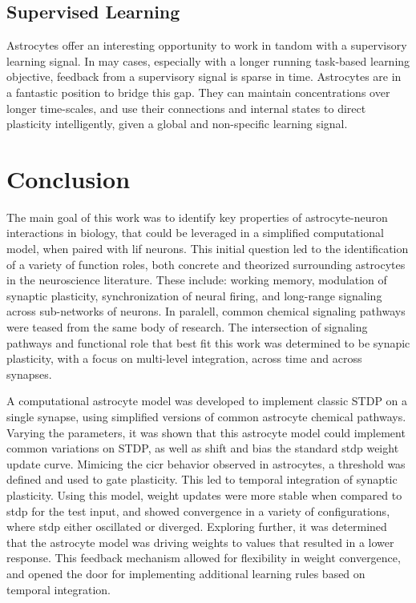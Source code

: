 \section{Supervised Learning}

Astrocytes offer an interesting opportunity to work in tandom with a supervisory
learning signal. In may cases, especially with a longer running task-based
learning objective, feedback from a supervisory signal is sparse in
time. Astrocytes are in a fantastic position to bridge this gap. They can
maintain \ca concentrations over longer time-scales, and use their connections
and internal states to direct plasticity intelligently, given a global and
non-specific learning signal.

\chapter{Conclusion} \label{chapter:conclusion}

The main goal of this work was to identify key properties of astrocyte-neuron
interactions in biology, that could be leveraged in a simplified computational
model, when paired with \gls{lif} neurons. This initial question led to the
identification of a variety of function roles, both concrete and theorized
surrounding astrocytes in the neuroscience literature. These include: working
memory, modulation of synaptic plasticity, synchronization of neural firing, and
long-range signaling across sub-networks of neurons. In paralell, common
chemical signaling pathways were teased from the same body of
research. The intersection of signaling pathways and functional role that best
fit this work was determined to be synapic plasticity, with a focus on
multi-level integration, across time and across synapses.

A computational astrocyte model was developed to implement classic STDP
on a single synapse, using simplified versions of common astrocyte chemical
pathways. Varying the parameters, it was shown that this astrocyte model could
implement common variations on STDP, as well as shift and bias the standard
\gls{stdp} weight update curve. Mimicing the \gls{cicr} behavior observed in
astrocytes, a threshold was defined and used to gate plasticity. This led to
temporal integration of synaptic plasticity. Using this model, weight updates
were more stable when compared to \gls{stdp} for the test input, and showed
convergence in a variety of configurations, where \gls{stdp} either oscillated
or diverged. Exploring further, it was determined that the astrocyte model was
driving weights to values that resulted in a lower \ca response. This feedback
mechanism allowed for flexibility in weight convergence, and opened the door for
implementing additional learning rules based on temporal integration.

